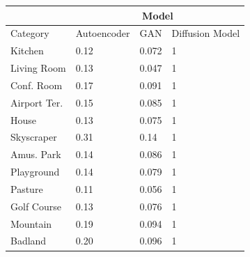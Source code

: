 \documentclass{UoYCSproject}
\begin{document}
\begin{table}[]
    \centering
    \begin{tabular}{|l|lll|}
        \hline
        \multicolumn{1}{|c|}{} & \multicolumn{3}{c|}{Model}                                                                          \\ \hline
        Category               & \multicolumn{1}{c|}{Autoencoder} & \multicolumn{1}{c|}{GAN}  & \multicolumn{1}{c|}{Diffusion Model} \\ \hline
        Kitchen                & \multicolumn{1}{l|}{0.12}        & \multicolumn{1}{l|}{0.072}& 1                                    \\ \hline
        Living Room            & \multicolumn{1}{l|}{0.13}        & \multicolumn{1}{l|}{0.047}& 1                                    \\ \hline
        Conf. Room             & \multicolumn{1}{l|}{0.17}        & \multicolumn{1}{l|}{0.091}& 1                                    \\ \hline
        Airport Ter.           & \multicolumn{1}{l|}{0.15}        & \multicolumn{1}{l|}{0.085}& 1                                    \\ \hline
        House                  & \multicolumn{1}{l|}{0.13}        & \multicolumn{1}{l|}{0.075}& 1                                    \\ \hline
        Skyscraper             & \multicolumn{1}{l|}{0.31}        & \multicolumn{1}{l|}{0.14 }& 1                                    \\ \hline
        Amus. Park             & \multicolumn{1}{l|}{0.14}        & \multicolumn{1}{l|}{0.086}& 1                                    \\ \hline
        Playground             & \multicolumn{1}{l|}{0.14}        & \multicolumn{1}{l|}{0.079}& 1                                    \\ \hline
        Pasture                & \multicolumn{1}{l|}{0.11}        & \multicolumn{1}{l|}{0.056}& 1                                    \\ \hline
        Golf Course            & \multicolumn{1}{l|}{0.13}        & \multicolumn{1}{l|}{0.076}& 1                                    \\ \hline
        Mountain               & \multicolumn{1}{l|}{0.19}        & \multicolumn{1}{l|}{0.094}& 1                                    \\ \hline
        Badland                & \multicolumn{1}{l|}{0.20}        & \multicolumn{1}{l|}{0.096}& 1                                    \\ \hline

\end{tabular}
\end{table}
\end{document}
